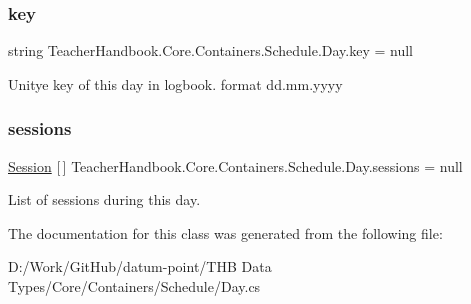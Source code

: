 \subsubsection{\texorpdfstring{key}{key}}
{\footnotesize\ttfamily string Teacher\+Handbook.\+Core.\+Containers.\+Schedule.\+Day.\+key = null}



Unitye key of this day in logbook. format dd.\+mm.\+yyyy 

\mbox{\label{class_teacher_handbook_1_1_core_1_1_containers_1_1_schedule_1_1_day_ab7130291674ea826085d0090d6acdddb}} 
\subsubsection{\texorpdfstring{sessions}{sessions}}
{\footnotesize\ttfamily \mbox{\hyperlink{class_teacher_handbook_1_1_core_1_1_containers_1_1_schedule_1_1_session}{Session}} \mbox{[}$\,$\mbox{]} Teacher\+Handbook.\+Core.\+Containers.\+Schedule.\+Day.\+sessions = null}



List of sessions during this day. 



The documentation for this class was generated from the following file\+:\begin{DoxyCompactItemize}
\item 
D\+:/\+Work/\+Git\+Hub/datum-\/point/\+T\+H\+B Data Types/\+Core/\+Containers/\+Schedule/Day.\+cs\end{DoxyCompactItemize}
